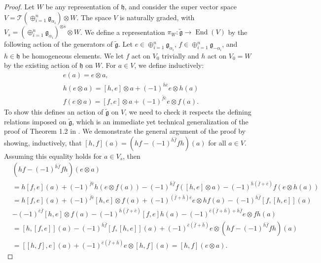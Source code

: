 \documentclass[12pt, a4paper, reqno]{amsart}
\def\TT{\mathcal{T}}
\theoremstyle{definition}
\theoremstyle{definition}
\theoremstyle{definition}
\numberwithin{theorem}{section}
\numberwithin{lemma}{section}
\numberwithin{remark}{section}
\numberwithin{definition}{section}
\numberwithin{corollary}{section}
\numberwithin{proposition}{section}
\numberwithin{example}{section}
\begin{document}
	\begin{proof}
		Let \(W\) be any representation of \(\mathfrak{h}\), and consider the super vector space \linebreak \(V = \TT(\oplus_{i=1}^n \mathfrak{g}_{\alpha_i})\otimes W\). The space \(V\) is naturally graded, with \(V_s = (\oplus_{i=1}^n \mathfrak{g}_{\alpha_i})^{\otimes s}\otimes W\). We define a representation \(\pi_W : \tilde{\mathfrak{g}} \rightarrow \operatorname{End}(V)\) by the following action of the generators of \(\tilde{\mathfrak{g}}\). Let \(e \in \oplus_{i=1}^n \mathfrak{g}_{\alpha_i}\), \(f \in \oplus_{i=1}^n \mathfrak{g}_{-\alpha_i}\), and \(h\in \mathfrak{h}\) be homogeneous elements. We let \(f\) act on \(V_0\) trivially and \(h\) act on \(V_0=W\) by the existing action of \(\mathfrak{h}\) on $W$. For \(a\in V\), we define inductively:
		\begin{align*}
			& e(a) = e\otimes a, \\
			& h(e\otimes a) = [h,e]\otimes a + (-1)^{\bar{h}\bar{e}} e\otimes h(a) \\ 
			& f(e\otimes a) = [f,e]\otimes a + (-1)^{\bar{f}\bar{e}} e\otimes f(a). 
		\end{align*}
		To show this defines an action of \(\tilde{\mathfrak{g}}\) on \(V\), we need to check it respects the defining relations imposed on \(\tilde{\mathfrak{g}}\), which is an immediate yet technical generalization of the proof of Theorem 1.2 in \cite{K}.  We demonstrate the general argument of the proof by showing, inductively, that \([h,f](a) = (hf-(-1)^{\bar{h}\bar{f}}fh)(a)\) for all \(a \in V\). Assuming this equality holds for \(a \in V_s\), then
		\begin{align*}
			& (hf-(-1)^{\bar{h}\bar{f}}fh)(e\otimes a) \\ 
			& = h[f,e](a) + (-1)^{\bar{f}\bar{e}}h(e\otimes f(a)) -(-1)^{\bar{h}\bar{f}}f([h,e]\otimes a) - (-1)^{\bar{h}(\bar{f}+\bar{e})}f(e\otimes h(a)) \\ & = h[f,e](a) + (-1)^{\bar{f}\bar{e}}[h,e]\otimes f(a) + (-1)^{(\bar{f}+\bar{h})\bar{e}}e\otimes hf(a) - (-1)^{\bar{h}\bar{f}} [f,[h,e]](a) \\ 
			& - (-1)^{\bar{e}\bar{f}}[h,e]\otimes f(a) - (-1)^{\bar{h}(\bar{f}+\bar{e})}[f,e]h(a) - (-1)^{\bar{e}(\bar{f}+\bar{h})+\bar{h}\bar{f}}e\otimes fh(a) \\
			& = [h,[f,e]](a) - (-1)^{\bar{h}\bar{f}}[f,[h,e]](a) + (-1)^{\bar{e}(\bar{f}+\bar{h})}e\otimes(hf-(-1)^{\bar{h}\bar{f}}fh)(a) \\ 
			& = [[h,f],e](a) + (-1)^{\bar{e}(\bar{f}+\bar{h})}e\otimes[h,f](a) = [h,f](e\otimes a).

\end{align*}
\end{proof}
\end{document}

